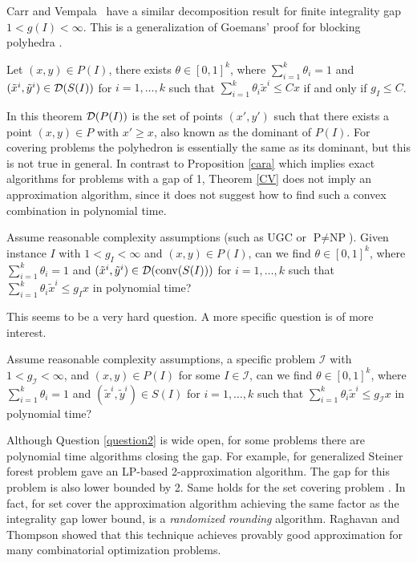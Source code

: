 Carr and Vempala~\cite{CV} have a similar decomposition result for finite integrality gap $1<g(I)<\infty$. %
This is a generalization of Goemans' proof for blocking polyhedra \cite{goemans}. 

\begin{theorem} \label{CV}
	Let $(x,y)\in P(I)$, there exists $\theta \in [0,1]^k$, where $\sum_{i=1}^{k}\theta_i =1$ and $(\tilde{x}^i,\tilde{y}^i)\in \operatorname{\mathcal{D}}(S(I))$ for $i=1,\ldots,k$ such that $\sum_{i=1}^{k}\theta_i \tilde{x}^i\leq Cx$ if and only if $g_I \leq C$.
\end{theorem}
In this theorem $\operatorname{\mathcal{D}}(P(I))$ is the set of points $(x',y')$ such that there exists a point $(x,y)\in P$ with $x'\geq x$, also known as the dominant of $P(I)$. For covering problems the polyhedron is essentially the same as its dominant, but this is not true in general. In contrast to Proposition \ref{cara} which implies exact algorithms for problems with a gap of 1, Theorem \ref{CV} does not imply an approximation algorithm, since it does not suggest how to find such a convex combination in polynomial time.

\iffalse

\begin{question}\label{question1}
	Assume reasonable complexity assumptions (such as UGC or $\textrm{P}\neq \textrm{NP}$). Given instance $I$ with $1<g_I<\infty$ and $(x,y)\in P(I)$, can we find $\theta \in [0,1]^k$, where $\sum_{i=1}^{k}\theta_i =1$ and $(\tilde{x}^i,\tilde{y}^i)\in \operatorname{\mathcal{D}}(\operatorname{conv}(S(I)))$ for $i=1,\ldots,k$ such that $\sum_{i=1}^{k}\theta_i \tilde{x}^i\leq g_Ix$ in polynomial time?
\end{question}

This seems to be a very hard question. A more specific question is of more interest.

\begin{question}\label{question2}
	Assume reasonable complexity assumptions, a specific problem $\mathcal{I}$ with  $1<g_{\mathcal{I}}<\infty$, and $(x,y)\in P(I)$ for some $I\in \mathcal{I}$, can we find $\theta \in [0,1]^k$, where $\sum_{i=1}^{k}\theta_i =1$ and $(\tilde{x}^i,\tilde{y}^i)\in S(I)$ for $i=1,\ldots,k$ such that $\sum_{i=1}^{k}\theta_i \tilde{x}^i\leq g_{\mathcal{I}}x$ in polynomial time?
\end{question}
Although Question \ref{question2} is wide open, for some problems there are polynomial time algorithms closing the gap. For example, for generalized Steiner forest problem \cite{jain} gave an LP-based 2-approximation algorithm. The gap for this problem is also lower bounded by 2. Same holds for the set covering problem \cite{randomizedrounding}. In fact, for set cover the approximation algorithm achieving the same factor as the integrality gap lower bound, is a \textit{randomized rounding} algorithm. Raghavan and Thompson \cite{randomizedrounding} showed that this technique achieves provably good approximation for many combinatorial optimization problems.  

